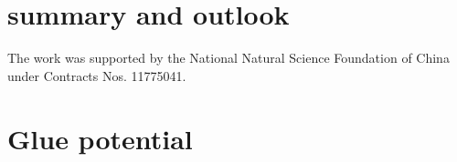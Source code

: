 \documentclass[%
reprint,
superscriptaddress,
showpacs,preprintnumbers,
 amsmath,amssymb,
 aps,
prd,
]{revtex4-1}
\begin{document}
 












\section{summary and outlook}
\label{sec:summary}





\begin{acknowledgments}

The work was supported by the National Natural Science Foundation of China under Contracts Nos. 11775041.

\end{acknowledgments}


\appendix

\section{Glue potential}
\label{app:gluepot}
\end{document}
